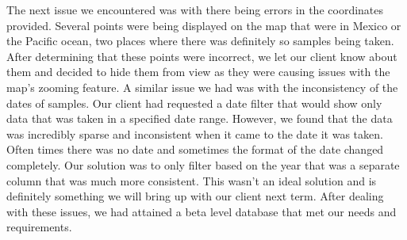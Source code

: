 \documentclass[10pt,draftclsnofoot,onecolumn]{IEEEtran}
\begin{document}
The next issue we encountered was with there being errors in the coordinates provided.
Several points were being displayed on the map that were in Mexico or the Pacific ocean, two places where there was definitely so samples being taken.
After determining that these points were incorrect, we let our client know about them and decided to hide them from view as they were causing issues with the map's zooming feature.
A similar issue we had was with the inconsistency of the dates of samples.
Our client had requested a date filter that would show only data that was taken in a specified date range.
However, we found that the data was incredibly sparse and inconsistent when it came to the date it was taken.
Often times there was no date and sometimes the format of the date changed completely.
Our solution was to only filter based on the year that was a separate column that was much more consistent.
This wasn't an ideal solution and is definitely something we will bring up with our client next term.
After dealing with these issues, we had attained a beta level database that met our needs and requirements.
\end{document}
